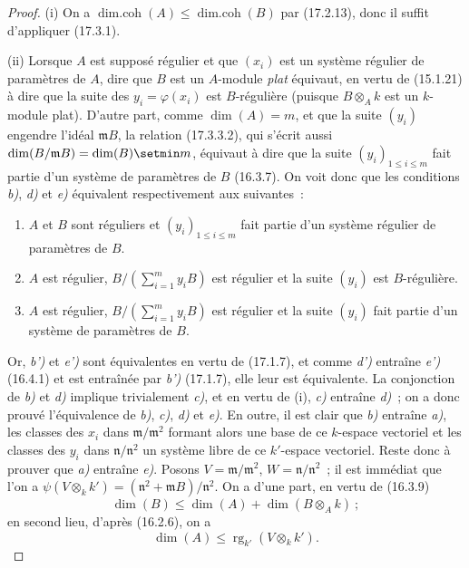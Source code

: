 \begin{proof}
\textnormal{(i)} On a
$\operatorname{dim.coh}(A)\leq\operatorname{dim.coh}(B)$ par (17.2.13), donc
il suffit d'appliquer (17.3.1).

\textnormal{(ii)} Lorsque $A$ est supposé régulier et que $(x_i)$ est un
système régulier de paramètres de $A$, dire que $B$ est un $A$-module
\emph{plat} équivaut, en vertu de (15.1.21) à dire que la suite des
$y_i=\varphi(x_i)$ est $B$-régulière (puisque $B\otimes_A k$ est un
$k$-module plat). D'autre part, comme $\dim(A)=m$, et que la suite $(y_i)$
engendre l'idéal $\mathfrak{m}B$, la relation (17.3.3.2), qui s'écrit aussi
$\dim(B/\mathfrak{m}B)=\dim(B)\setmin m$, équivaut à dire que la suite
$(y_i)_{1\leq i\leq m}$ fait partie d'un système de paramètres de $B$
(16.3.7). On voit donc que les conditions \emph{b)}, \emph{d)} et \emph{e)} équivalent
respectivement aux suivantes~:
\begin{enumerate}
  \item[\textit{b')}] $A$ et $B$ sont réguliers et $(y_i)_{1\leq i\leq m}$ fait
  partie d'un système régulier de paramètres de $B$.
  \item[\textit{d')}] $A$ est régulier,
  $B/(\sum_{i=1}^m y_iB)$ est régulier et la suite $(y_i)$ est
  $B$-régulière.
  \item[\textit{e')}] $A$ est régulier,
  $B/(\sum_{i=1}^m y_iB)$ est régulier et la suite $(y_i)$ fait partie d'un
  système de paramètres de $B$.
\end{enumerate}

Or, \emph{b')} et \emph{e')} sont équivalentes en vertu de (17.1.7), et comme \emph{d')} entraîne
\emph{e')} (16.4.1) et est entraînée par \emph{b')} (17.1.7), elle leur est équivalente. La
conjonction
de \emph{b)} et \emph{d)} implique trivialement \emph{c)}, et en vertu de (i), \emph{c)} entraîne \emph{d)}~; on
a donc prouvé l'équivalence de \emph{b)}, \emph{c)}, \emph{d)} et \emph{e)}. En outre, il est clair que \emph{b)}
entraîne \emph{a)}, les classes des $x_i$ dans
$\mathfrak{m}/\mathfrak{m}^2$ formant alors une base de ce $k$-espace
vectoriel et les classes des $y_i$ dans $\mathfrak{n}/\mathfrak{n}^2$ un
système libre de ce $k'$-espace vectoriel. Reste donc à prouver que \emph{a)}
entraîne \emph{e)}. Posons $V=\mathfrak{m}/\mathfrak{m}^2$,
$W=\mathfrak{n}/\mathfrak{n}^2$~; il est immédiat que l'on a
$\psi(V\otimes_k k')=(\mathfrak{n}^2+\mathfrak{m}B)/\mathfrak{n}^2$. On a
d'une part, en vertu de (16.3.9)
\begin{equation}
\label{0.17.3.3.3-fr}
\tag{17.3.3.3}
  \dim(B)\leq\dim(A)+\dim(B\otimes_A k)~;
\end{equation}
en second lieu, d'après (16.2.6), on a
\begin{equation}
\label{0.17.3.3.4-fr}
\tag{17.3.3.4}
  \dim(A)\leq\operatorname{rg}_{k'}(V\otimes_k k').
\end{equation}


\end{proof}
